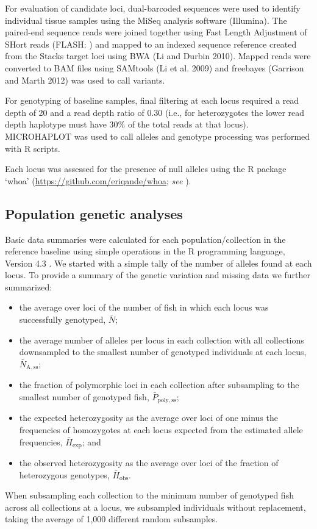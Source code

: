 For evaluation of candidate loci, dual-barcoded sequences were used
to identify individual tissue samples using the MiSeq analysis software (Illumina).
The paired-end sequence reads were joined together using Fast Length Adjustment
of SHort reads (FLASH: \citealt{magovc2011flash}) and mapped to an indexed sequence reference created from the Stacks target loci using BWA (Li and Durbin 2010). Mapped reads were converted to BAM files using SAMtools (Li et al. 2009) and freebayes (Garrison and Marth 2012) was used to call variants.

For genotyping of baseline samples, final filtering at each locus required a read depth of 20 and a read depth ratio of 0.30 (i.e., for heterozygotes the lower read depth haplotype must have 30\% of the total reads at that locus). MICROHAPLOT was used to call alleles and genotype processing was performed with R scripts.

Each locus was assessed for the presence of null alleles using the R package `whoa'
(\url{https://github.com/eriqande/whoa}; {\em see} \citealt{hendricks2018recent}).

\subsection*{Population genetic analyses}

Basic data summaries were calculated for each population/collection
in the reference baseline
using simple operations in the R programming language, Version 4.3
\citep{rcore}. We started with a simple tally of the number of alleles
found at each locus.  To provide a summary of the genetic variation and
missing data we further summarized:
\begin {itemize}
\item the average over loci of the number of fish
in which each locus was successfully genotyped, $\bar{N}$;
\item the average number of alleles per locus in each collection with all collections
downsampled to the smallest number of genotyped individuals at each
locus, $\bar{N}_\mathrm{A,ss}$;
\item the fraction of polymorphic
loci in each collection after subsampling to the smallest number of genotyped
fish, $\bar{P}_\mathrm{poly,ss}$;
\item the expected heterozygosity as the average over loci
of one minus the frequencies of homozygotes at each locus expected from the
estimated allele frequencies, $\bar{H}_\mathrm{exp}$; and
\item the observed heterozygosity as the average over
loci of the fraction of heterozygous genotypes, $\bar{H}_\mathrm{obs}$.
\end{itemize}
When subsampling each collection to the minimum number of genotyped
fish across all collections at a locus, we subsampled individuals without
replacement, taking the average of 1,000 different random subsamples.


